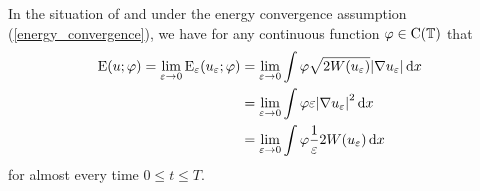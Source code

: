 \begin{lemma}
	\label{equipartition_of_energies}
	In the situation of  and under the energy 
	convergence assumption (\ref{energy_convergence}), we have 
	for any continuous function $ \varphi \in \operatorname{C} ( \operatorname{\mathbb{T}} ) $ 
	that
	\begin{align*}
		\operatorname{E} ( u ; \varphi )
		=
		\lim_{ \varepsilon \to 0 }
		\operatorname{E}_{ \varepsilon } ( u_{ \varepsilon } ; \varphi )
		& = 
		\lim_{ \varepsilon \to 0 }
		\int
		\varphi
		\sqrt{ 2 W ( u_{ \varepsilon } ) }
		\abs{ \nabla u_{ \varepsilon } }
		\dd{ x }
		\\
		& =
		\lim_{ \varepsilon \to 0 }
		\int
		\varphi
		\varepsilon
		\abs{ \nabla u_{ \varepsilon } }^{ 2 }
		\dd{ x}
		\\
		& =
		\lim_{ \varepsilon \to 0 }
		\int
		\varphi
		\frac{ 1 }{ \varepsilon }
		2 W ( u_{ \varepsilon } )
		\dd{ x }
	\end{align*}
	for almost every time $ 0 \leq t \leq T $.
\end{lemma}

